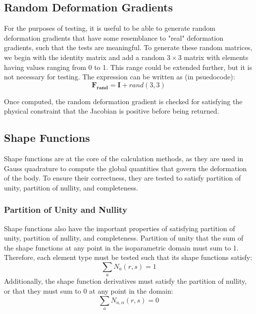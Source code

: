 \documentclass[]{spie}  %
\begin{document}
\subsection{Random Deformation Gradients}
For the purposes of testing, it is useful to be able to generate random deformation gradients that have some resemblance to "real" deformation gradients, such that the tests are meaningful. To generate these random matrices, we begin with the identity matrix and add a random $3 \times 3$ matrix with elements having values ranging from 0 to 1. This range could be extended further, but it is not necessary for testing. The expression can be written as (in psuedocode):
\begin{equation}
\label{eq: random deformation gradient}
\bm{F_{rand}} = \bm{I} + rand(3,3)
\end{equation}

Once computed, the random deformation gradient is checked for satisfying the physical constraint that the Jacobian is positive before being returned. 


\subsection{Shape Functions}
Shape functions are at the core of the calculation methods, as they are used in Gauss quadrature to compute the global quantities that govern the deformation of the body. To ensure their correctness, they are tested to satisfy partition of unity, partition of nullity, and completeness. 

\subsubsection{Partition of Unity and Nullity}
Shape functions also have the important properties of satisfying partition of unity, partition of nullity, and completeness. Partition of unity that the sum of the shape functions at any point in the isoparametric domain must sum to 1. Therefore, each element type must be tested such that its shape functions satisfy:
\begin{equation}
\label{eq: partition of unity}
\sum\limits_{a} N_a(r,s) = 1
\end{equation}
Additionally, the shape function derivatives must satisfy the partition of nullity, or that they must sum to 0 at any point in the domain:
\begin{equation}
\label{eq: partition of nullity}
\sum\limits_{a} N_{a,\alpha}(r,s) = 0
\end{equation}
\end{document}
